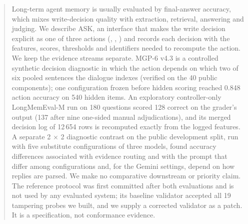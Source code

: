 \begin{abstract}
Long-term agent memory is usually evaluated by final-answer accuracy, which mixes write-decision quality with extraction, retrieval, answering and judging. We describe ASK, an interface that makes the write decision explicit as one of three actions (\keep, \supersede, \abstain) and records each decision with the features, scores, thresholds and identifiers needed to recompute the action. We keep the evidence streams separate. MGP-6 v4.3 is a controlled synthetic decision diagnostic in which the action depends on which two of six pooled sentences the dialogue indexes (verified on the 40 public components); one configuration frozen before hidden scoring reached 0.848 action accuracy on 540 hidden items. An exploratory controller-only LongMemEval-M run on 180 questions scored 128 correct on the grader's output (137 after nine one-sided manual adjudications), and its merged decision log of 12\,654 rows is recomputed exactly from the logged features. A separate 2 $\times$ 2 diagnostic contrast on the public development split, run with five substitute configurations of three models, found accuracy differences associated with evidence routing and with the prompt that differ among configurations and, for the Gemini settings, depend on how replies are parsed. We make no comparative downstream or priority claim. The reference protocol was first committed after both evaluations and is not used by any evaluated system; its baseline validator accepted all 19 tampering probes we built, and we supply a corrected validator as a patch. It is a specification, not conformance evidence.
\end{abstract}
